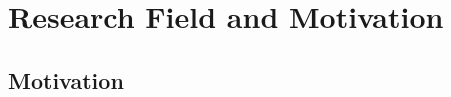 \section{Research Field and Motivation}\label{sec:research_mot}
\subsection{Motivation}\label{subsec:motivation}
%
%
%
